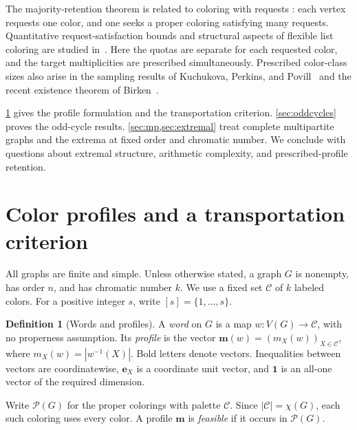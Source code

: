 \documentclass[10pt,a4paper]{amsart}
\numberwithin{equation}{section}
\theoremstyle{definition}
\newtheorem{definition}[theorem]{Definition}
\theoremstyle{remark}
\begin{document}
The majority-retention theorem is related to coloring with requests
\cite{dvorak2019}: each vertex requests one color, and one seeks a
proper coloring satisfying many requests. Quantitative request-satisfaction
bounds and structural aspects of flexible list coloring are studied
in~\cite{Kaul2024,Bowdoin2025}.
Here the quotas are separate for each requested color, and the target
multiplicities are prescribed simultaneously. Prescribed color-class
sizes also arise in the sampling results of Kuchukova, Perkins, and
Povill~\cite{Kuchukova2026} and the recent existence theorem of
Birken~\cite{Birken2026}.

\cref{sec:preliminaries} gives the profile formulation and the
transportation criterion. \cref{sec:oddcycles} proves the
odd-cycle results. \cref{sec:mp,sec:extremal}
treat complete multipartite graphs and the extrema at fixed order
and chromatic number. We conclude with questions about extremal
structure, arithmetic complexity, and prescribed-profile retention.

\section{Color profiles and a transportation criterion}\label{sec:preliminaries}

All graphs are finite and simple. Unless otherwise stated, a graph $G$ is
nonempty, has order $n$, and has chromatic number $k$. We use a fixed set
$\mathcal C$ of $k$ labeled colors. For a positive integer $s$, write
$[s]=\{1,\ldots,s\}$.

\begin{definition}[Words and profiles]\label{def:profile}
A \emph{word} on $G$ is a map
$w:V(G)\to\mathcal C$, with no properness assumption. Its \emph{profile}
is the vector $\mathbf m(w)=(m_X(w))_{X\in\mathcal C}$, where
$m_X(w)=|w^{-1}(X)|$. Bold letters denote vectors. Inequalities between
vectors are coordinatewise, $\mathbf e_X$ is a coordinate unit vector,
and $\mathbf1$ is an all-one vector of the required dimension.

Write $\mathcal P(G)$ for the proper colorings with palette $\mathcal C$.
Since $|\mathcal C|=\chi(G)$, each such coloring uses every color. A profile
$\mathbf m$ is \emph{feasible} if it occurs in $\mathcal P(G)$.
\end{definition}
\end{document}
